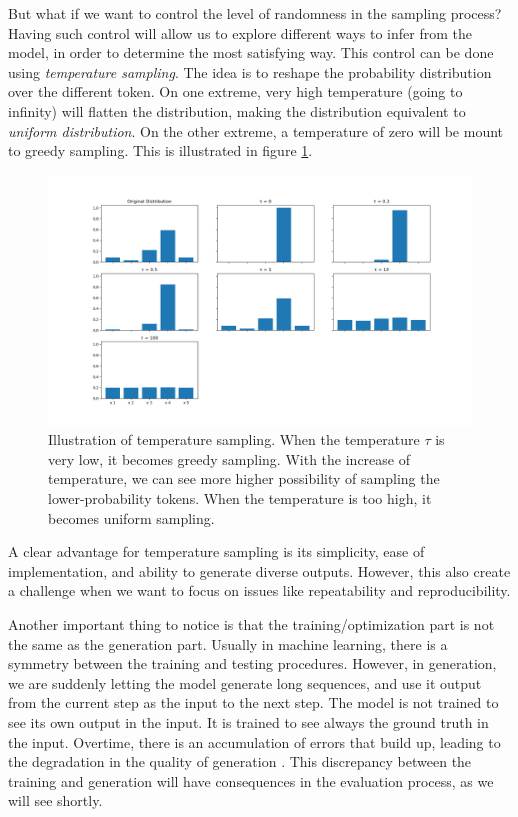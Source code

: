 \par But what if we want to control the level of randomness in the sampling process? Having such control will allow us to explore different ways to infer from the model, in order to determine the most satisfying way. This control can be done using \textit{temperature sampling}. The idea is to reshape the probability distribution over the different token. On one extreme, very high temperature (going to infinity) will flatten the distribution, making the distribution equivalent to \textit{uniform distribution}. On the other extreme, a temperature of zero will be mount to greedy sampling. This is illustrated in figure \ref{fig:temperature_sampling}.

\begin{figure}
    \centering
    \includegraphics[scale=0.5]{images/gbem/temperature_sampling.png}
    \caption{Illustration of temperature sampling. When the temperature $\tau$ is very low, it becomes greedy sampling. With the increase of temperature, we can see more higher possibility of sampling the lower-probability tokens. When the temperature is too high, it becomes uniform sampling.}
    \label{fig:temperature_sampling}
\end{figure}

\par A clear advantage for temperature sampling is its simplicity, ease of implementation, and ability to generate diverse outputs. However, this also create a challenge when we want to focus on issues like repeatability and reproducibility.

\par Another important thing to notice is that the training/optimization part is not the same as the generation part. Usually in machine learning, there is a symmetry between the training and testing procedures. However, in generation, we are suddenly letting the model generate long sequences, and use it output from the current step as the input to the next step. The model is not trained to see its own output in the input. It is trained to see always the ground truth in the input. Overtime, there is an accumulation of errors that build up, leading to the degradation in the quality of generation \citep{DBLP:journals/corr/RanzatoCAZ15}. This discrepancy between the training and generation will have consequences in the evaluation process, as we will see shortly.

